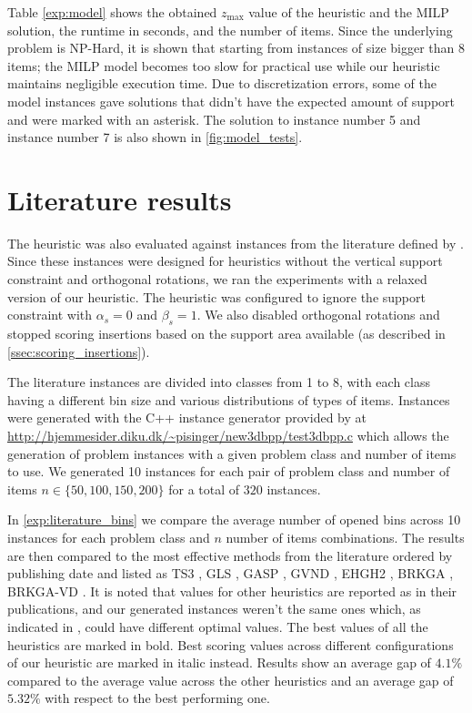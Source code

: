 Table \ref{exp:model} shows the obtained $z_{\text{max}}$ value of the heuristic and the MILP solution, the runtime in seconds, and the number of items.
Since the underlying problem is NP-Hard, it is shown that starting from instances of size bigger than 8 items; the MILP model becomes too slow for practical use while our heuristic maintains negligible execution time.
Due to discretization errors, some of the model instances gave solutions that didn't have the expected amount of support and were marked with an asterisk.
The solution to instance number 5 and instance number 7 is also shown in \cref{fig:model_tests}.
\label{exp:model_tests}



\clearpage
\section{Literature results}
The heuristic was also evaluated against instances from the literature defined by \cite{martello2000three}.
Since these instances were designed for heuristics without the vertical support constraint and orthogonal rotations, we ran the experiments with a relaxed version of our heuristic.
The heuristic was configured to ignore the support constraint with $\alpha_s = 0$ and $\beta_s = 1$. We also disabled orthogonal rotations and stopped scoring insertions based on the support area available (as described in \cref{ssec:scoring_insertions}).

\label{def:class1_instances}
The literature instances are divided into classes from 1 to 8, with each class having a different bin size and various distributions of types of items.
Instances were generated with the C++ instance generator provided by \cite{martello2000three} at \url{http://hjemmesider.diku.dk/~pisinger/new3dbpp/test3dbpp.c} which allows the generation of problem instances with a given problem class and number of items to use.
We generated 10 instances for each pair of problem class and number of items $n \in \{50, 100, 150, 200\}$ for a total of $320$ instances.

In \cref{exp:literature_bins} we compare the average number of opened bins across 10 instances for each problem class and $n$ number of items combinations.
The results are then compared to the most effective methods from the literature ordered by publishing date and listed as TS3 \citep{lodi2002heuristic}, GLS \citep{faroe2003guided}, GASP \citep{crainic2009ts2pack}, GVND \citep{parreno2010hybrid}, EHGH2 \citep{hifi2014hybrid}, BRKGA \citep{gonccalves2013biased}, BRKGA-VD \citep{zudio2018brkga}.
It is noted that values for other heuristics are reported as in their publications, and our generated instances weren't the same ones which, as indicated in \cite{hifi2014hybrid}, could have different optimal values.
The best values of all the heuristics are marked in bold. Best scoring values across different configurations of our heuristic are marked in italic instead.
Results show an average gap of $4.1\%$ compared to the average value across the other heuristics and an average gap of $5.32\%$ with respect to the best performing one.

